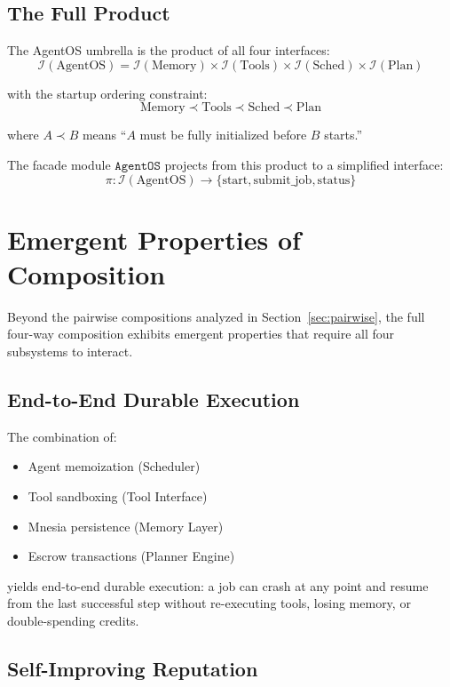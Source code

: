 \documentclass[12pt,a4paper]{article}
\theoremstyle{definition}
\begin{document}
\subsection{The Full Product}

The AgentOS umbrella is the product of all four interfaces:
\[
  \mathcal{I}(\text{AgentOS}) = \mathcal{I}(\text{Memory}) \times \mathcal{I}(\text{Tools}) \times \mathcal{I}(\text{Sched}) \times \mathcal{I}(\text{Plan})
\]

with the startup ordering constraint:
\[
  \text{Memory} \prec \text{Tools} \prec \text{Sched} \prec \text{Plan}
\]

where $A \prec B$ means ``$A$ must be fully initialized before $B$ starts.''

The facade module $\texttt{AgentOS}$ projects from this product to a simplified
interface:
\[
  \pi : \mathcal{I}(\text{AgentOS}) \to \{\text{start}, \text{submit\_job}, \text{status}\}
\]


\section{Emergent Properties of Composition}\label{sec:emergent}

Beyond the pairwise compositions analyzed in Section~\ref{sec:pairwise},
the full four-way composition exhibits emergent properties that require
all four subsystems to interact.

\subsection{End-to-End Durable Execution}

The combination of:
\begin{itemize}
  \item Agent memoization (Scheduler)
  \item Tool sandboxing (Tool Interface)
  \item Mnesia persistence (Memory Layer)
  \item Escrow transactions (Planner Engine)
\end{itemize}
yields end-to-end durable execution: a job can crash at any point and resume
from the last successful step without re-executing tools, losing memory, or
double-spending credits.

\subsection{Self-Improving Reputation}
\end{document}
